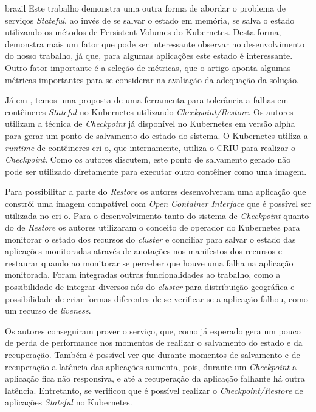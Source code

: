 \begin{otherlanguage*}{brazil}
Este trabalho demonstra uma outra forma de abordar o problema de serviços
\textit{Stateful}, ao invés de se salvar o estado em memória, se salva o
estado utilizando os métodos de Persistent Volumes do Kubernetes. Desta
forma, demonstra mais um fator que pode ser interessante observar no
desenvolvimento do nosso trabalho, já que, para algumas aplicações este
estado é interessante. Outro fator importante é a seleção de métricas, que
o artigo aponta algumas métricas importantes para se considerar na avaliação
da adequação da solução.

Já em \cite{schmidttransparent}, temos uma proposta de uma ferramenta para
tolerância a falhas em contêineres \textit{Stateful} no Kubernetes utilizando
\textit{Checkpoint/Restore}. Os autores utilizam a técnica de \textit{Checkpoint}
já disponível no Kubernetes em versão alpha para gerar um ponto de salvamento
do estado do sistema. O Kubernetes utiliza a \textit{runtime} de contêineres
cri-o\cite{cri-o}, que internamente, utiliza o CRIU\cite{criu} para realizar
o \textit{Checkpoint}. Como os autores discutem, este ponto de salvamento
gerado não pode ser utilizado diretamente para executar outro contêiner como
uma imagem.

Para possibilitar a parte do \textit{Restore} os autores desenvolveram uma
aplicação que constrói uma imagem compatível com \textit{Open Container Interface}
que é possível ser utilizada no cri-o. Para o desenvolvimento tanto do sistema
de \textit{Checkpoint} quanto do de \textit{Restore} os autores utilizaram o
conceito de operador do Kubernetes para monitorar o estado dos recursos do 
\textit{cluster} e conciliar para salvar o estado das aplicações monitoradas
através de anotações nos manifestos dos recursos e restaurar quando ao monitorar
se perceber que houve uma falha na aplicação monitorada. Foram integradas outras
funcionalidades ao trabalho, como a possibilidade de integrar diversos nós do
\textit{cluster} para distribuição geográfica e possibilidade de criar formas
diferentes de se verificar se a aplicação falhou, como um recurso de
\textit{liveness}.

Os autores conseguiram prover o serviço, que, como já esperado gera um pouco
de perda de performance nos momentos de realizar o salvamento do estado e da
recuperação. Também é possível ver que durante momentos de salvamento e de
recuperação a latência das aplicações aumenta, pois, durante um
\textit{Checkpoint} a aplicação fica não responsiva, e até a recuperação da
aplicação falhante há outra latência. Entretanto, se verificou que é possível
realizar o \textit{Checkpoint/Restore} de aplicações \textit{Stateful} no
Kubernetes.


\end{otherlanguage*}
